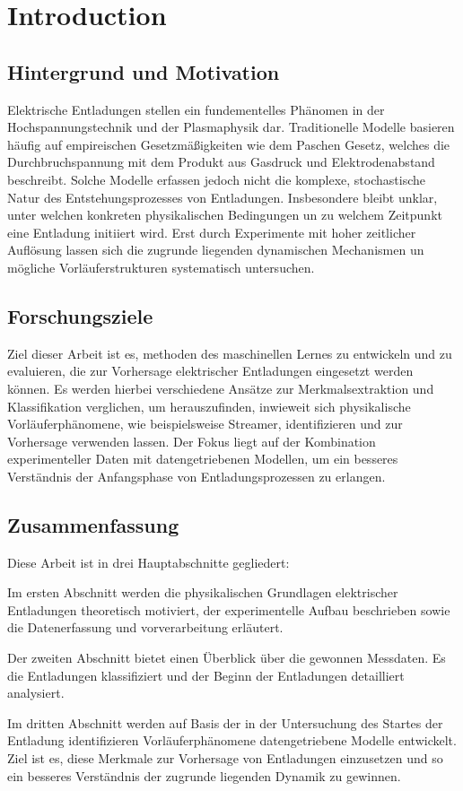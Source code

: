 \chapter{Introduction}
\label{chap:introduction}

\section{Hintergrund und Motivation}
\label{sec:background}

Elektrische Entladungen stellen ein fundementelles Phänomen in der Hochspannungstechnik und der Plasmaphysik dar. Traditionelle Modelle basieren häufig auf empireischen Gesetzmäßigkeiten wie dem Paschen Gesetz, welches die Durchbruchspannung mit dem Produkt aus Gasdruck und Elektrodenabstand beschreibt. Solche Modelle erfassen jedoch nicht die komplexe, stochastische Natur des Entstehungsprozesses von Entladungen. Insbesondere bleibt unklar, unter welchen konkreten physikalischen Bedingungen un zu welchem Zeitpunkt eine Entladung initiiert wird. Erst durch Experimente mit hoher zeitlicher Auflösung lassen sich die zugrunde liegenden dynamischen Mechanismen un mögliche Vorläuferstrukturen systematisch untersuchen.

\section{Forschungsziele}
\label{sec:objectives}

Ziel dieser Arbeit ist es, methoden des maschinellen Lernes zu entwickeln und zu evaluieren, die zur Vorhersage elektrischer Entladungen eingesetzt werden können. Es werden hierbei verschiedene Ansätze zur Merkmalsextraktion und Klassifikation verglichen, um herauszufinden, inwieweit sich physikalische Vorläuferphänomene, wie beispielsweise Streamer, identifizieren und zur Vorhersage verwenden lassen. Der Fokus liegt auf der Kombination experimenteller Daten mit datengetriebenen Modellen, um ein besseres Verständnis der Anfangsphase von Entladungsprozessen zu erlangen.

\section{Zusammenfassung}
\label{sec:intro_summary}
Diese Arbeit ist in drei Hauptabschnitte gegliedert:

Im ersten Abschnitt werden die physikalischen Grundlagen elektrischer Entladungen theoretisch motiviert, der experimentelle Aufbau beschrieben sowie die Datenerfassung und vorverarbeitung erläutert. 

Der zweiten Abschnitt bietet einen Überblick über die gewonnen Messdaten. Es die Entladungen klassifiziert und der Beginn der Entladungen detailliert analysiert.

Im dritten Abschnitt werden auf Basis der in der Untersuchung des Startes der Entladung identifizieren Vorläuferphänomene datengetriebene Modelle entwickelt. Ziel ist es, diese Merkmale zur Vorhersage von Entladungen einzusetzen und so ein besseres Verständnis der zugrunde liegenden Dynamik zu gewinnen.
